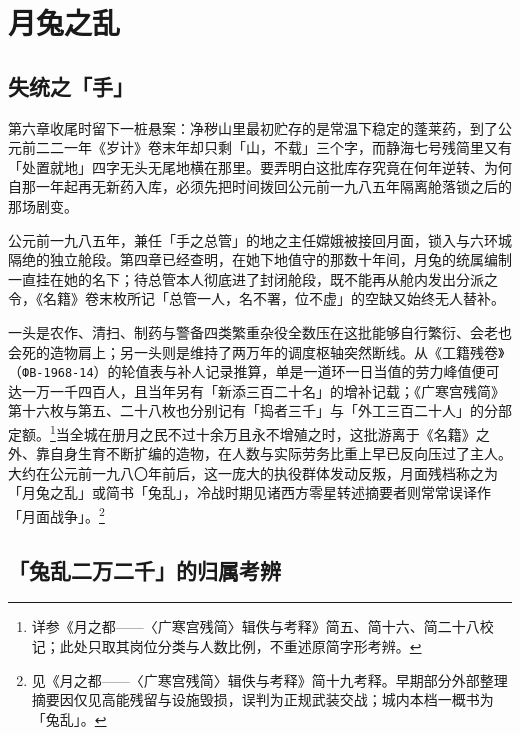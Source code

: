\chapter{月兔之乱}


\section{失统之「手」}

第六章收尾时留下一桩悬案：净秽山里最初贮存的是常温下稳定的蓬莱药，到了公元前二二一年《岁计》卷末年却只剩「山，不载」三个字，而静海七号残简里又有「处置就地」四字无头无尾地横在那里。要弄明白这批库存究竟在何年逆转、为何自那一年起再无新药入库，必须先把时间拨回公元前一九八五年隔离舱落锁之后的那场剧变。

公元前一九八五年，兼任「手之总管」的地之主任嫦娥被接回月面，锁入与六环城隔绝的独立舱段。第四章已经查明，在她下地值守的那数十年间，月兔的统属编制一直挂在她的名下；待总管本人彻底进了封闭舱段，既不能再从舱内发出分派之令，《名籍》卷末枚所记「总管一人，名不署，位不虚」的空缺又始终无人替补。

一头是农作、清扫、制药与警备四类繁重杂役全数压在这批能够自行繁衍、会老也会死的造物肩上；另一头则是维持了两万年的调度枢轴突然断线。从《工籍残卷》（\texttt{ФВ-1968-14}）的轮值表与补人记录推算，单是一道环一日当值的劳力峰值便可达一万一千四百人，且当年另有「新添三百二十名」的增补记载；《广寒宫残简》第十六枚与第五、二十八枚也分别记有「捣者三千」与「外工三百二十人」的分部定额。\footnote{详参《月之都——〈广寒宫残简〉辑佚与考释》简五、简十六、简二十八校记；此处只取其岗位分类与人数比例，不重述原简字形考辨。}当全城在册月之民不过十余万且永不增殖之时，这批游离于《名籍》之外、靠自身生育不断扩编的造物，在人数与实际劳务比重上早已反向压过了主人。大约在公元前一九八〇年前后，这一庞大的执役群体发动反叛，月面残档称之为「月兔之乱」或简书「兔乱」，冷战时期见诸西方零星转述摘要者则常常误译作「月面战争」。\footnote{见《月之都——〈广寒宫残简〉辑佚与考释》简十九考释。早期部分外部整理摘要因仅见高能残留与设施毁损，误判为正规武装交战；城内本档一概书为「兔乱」。}

\section{「兔乱二万二千」的归属考辨}

